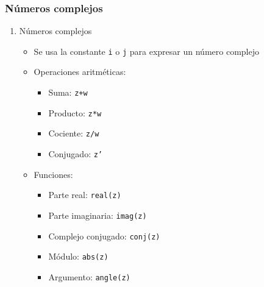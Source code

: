 \begin{frame}[label=complejos]
 \frametitle{Números complejos}
 \begin{enumerate}
  \item Números complejos 
    \begin{itemize}
     \item Se usa la constante \alert{\texttt{i}} o \texttt{j} para expresar un número
        complejo
     \item Operaciones aritméticas:
      \begin{itemize}
        \item Suma: \texttt{z+w}
        \item Producto: \texttt{z*w}
        \item Cociente: \texttt{z/w}
        \item Conjugado: \texttt{z'}
      \end{itemize}
     \item Funciones:
      \begin{itemize}
       \item Parte real: \texttt{real(z)}
       \item Parte imaginaria: \texttt{imag(z)}
       \item Complejo conjugado: \texttt{conj(z)}
       \item Módulo: \texttt{abs(z)}
       \item Argumento: \texttt{angle(z)}
      \end{itemize}
    \end{itemize}
 \end{enumerate}
\end{frame}
